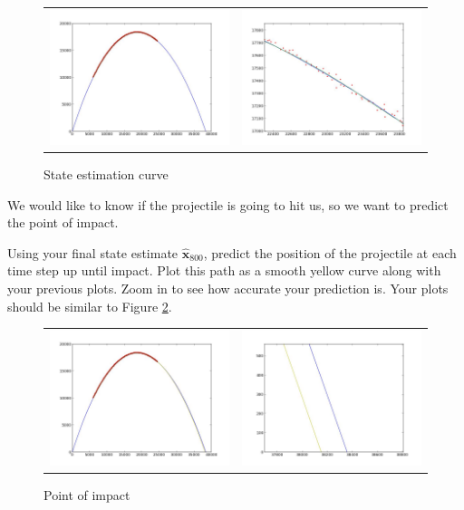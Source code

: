 \begin{figure}\label{problem3}
	\centering
	\begin{tabular}{cc} \includegraphics[width=6cm]{problem3_1.jpg} & \includegraphics[width=6cm]{problem3_2.jpg}
	\end{tabular}
	\caption{State estimation curve}
\end{figure}

We would like to know if the projectile is going to hit us, so we want to predict the point of impact.

\begin{problem}
Using your final state estimate $\widehat{\mathbf{x}}_{800}$, predict the position of the projectile at each time step up until impact. Plot this path as a smooth yellow curve along with your previous plots. Zoom in to see how accurate your prediction is. Your plots should be similar to Figure \ref{problem4}.
\end{problem}

\begin{figure}\label{problem4}
	\centering
	\begin{tabular}{cc} \includegraphics[width=6cm]{problem4_1.jpg} & \includegraphics[width=6cm]{problem4_2.jpg}
	\end{tabular}
	\caption{Point of impact}
\end{figure}

